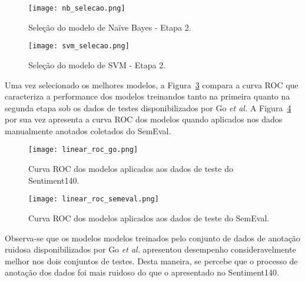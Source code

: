 \begin{figure}
\begin{center} {
    \begin{center}
    \texttt{[image: nb\_selecao.png]}
    \caption{Seleção do modelo de Naïve Bayes - Etapa 2.}
    \label{fig:nb_selecao}
    \end{center}
}
\end{center}
\end{figure}

\begin{figure}
\begin{center} {
    \begin{center}
    \texttt{[image: svm\_selecao.png]}
    \caption{Seleção do modelo de SVM - Etapa 2.}
    \label{fig:svm_selecao}
    \end{center}
}
\end{center}
\end{figure}

Uma vez selecionado os melhores modelos, a Figura~\ref{fig:linear_roc_go} compara a curva ROC que caracteriza a
performance dos modelos treinandos tanto na primeira quanto na segunda etapa sob os dados de testes disponibilizados
por Go \textit{et al.}
A Figura~\ref{fig:linear_roc_semeval} por sua vez apresenta a curva ROC dos modelos quando aplicados nos dados
manualmente anotados coletados do SemEval.

\begin{figure}
\begin{center} {
    \begin{center}
    \texttt{[image: linear\_roc\_go.png]}
    \caption{Curva ROC dos modelos aplicados aos dados de teste do Sentiment140.}
    \label{fig:linear_roc_go}
    \end{center}
}
\end{center}
\end{figure}

\begin{figure}
\begin{center} {
    \begin{center}
    \texttt{[image: linear\_roc\_semeval.png]}
    \caption{Curva ROC dos modelos aplicados aos dados de teste do SemEval.}
    \label{fig:linear_roc_semeval}
    \end{center}
}
\end{center}
\end{figure}

Observa-se que os modelos modelos treinados pelo conjunto de dados de anotação ruidosa disponibilizados por Go
\textit{et al.} apresentou desempenho consideravelmente melhor nos dois conjuntos de testes.
Desta maneira, se percebe que o processo de anotação dos dados foi mais ruidoso do que o apresentado no Sentiment140.

